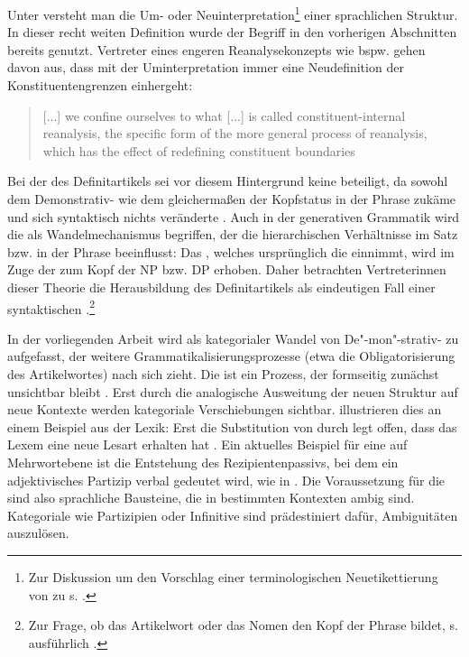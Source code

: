 Unter  versteht man die Um- oder Neuinterpretation\footnote{Zur Diskussion um den Vorschlag einer terminologischen Neuetikettierung von  zu  s.  \textcite[36]{Traugott2013}.} einer sprachlichen Struktur. In dieser recht weiten Definition wurde der Begriff in den vorherigen Abschnitten bereits genutzt. Vertreter eines engeren Reanalysekonzepts  wie bspw. \textcite[215]{Heine1991} gehen davon aus, dass mit der Uminterpretation immer eine Neudefinition der Konstituentengrenzen einhergeht: \blockcquote[216]{Heine1991}{[...] we confine ourselves to what [...] is called constituent-internal reanalysis, the specific form of the more general process of reanalysis, which has the effect of redefining constituent boundaries}. Bei der  des Definitartikels sei vor diesem Hintergrund keine   beteiligt, da sowohl dem Demonstrativ-  wie dem  gleichermaßen der Kopfstatus in der Phrase zukäme und sich syntaktisch nichts veränderte \parencite[219]{Heine1991}. Auch in der generativen Grammatik wird die  als Wandelmechanismus begriffen, der die hierarchischen Verhältnisse im Satz bzw. in der Phrase beeinflusst: Das , welches ursprünglich die  einnimmt, wird im Zuge der  zum Kopf der NP  bzw. DP erhoben. Daher betrachten Vertreterinnen dieser Theorie die Herausbildung des Definitartikels als eindeutigen Fall einer syntaktischen  \parencite[vgl. bspw.][]{Philippi1997,vanGelderen2007}.\footnote{Zur Frage, ob das Artikelwort oder das Nomen den Kopf der Phrase bildet, s. ausführlich \textcite[145--146]{Himmelmann1997}.}

In der vorliegenden Arbeit wird  als kategorialer Wandel von De"-mon"-strativ- zu  aufgefasst, der weitere Grammatikalisierungsprozesse  (etwa die Obligatorisierung des Artikelwortes) nach sich zieht. Die  ist ein Prozess, der formseitig zunächst unsichtbar bleibt \parencite[58]{Langacker1977}. Erst durch die analogische  Ausweitung der neuen Struktur auf neue Kontexte werden kategoriale Verschiebungen sichtbar. \textcite[50]{Hopper2006} illustrieren dies an einem Beispiel aus der Lexik: Erst die Substitution von  durch  legt offen, dass das Lexem  eine neue Lesart erhalten hat \parencite[urspr. ][389]{Kluge2011}. Ein aktuelles Beispiel für eine  auf Mehrwortebene ist die Entstehung des Rezipientenpassivs, bei dem ein adjektivisches Partizip  verbal gedeutet wird, wie in  \parencite[152--153]{Szczepaniak2011a}.
Die Voraussetzung für die  sind also sprachliche Bausteine, die in bestimmten Kontexten ambig sind. Kategoriale  wie Partizipien oder Infinitive \parencite[vgl. die  des -Progressivs: Aus einem nominalen wird ein verbaler Infinitiv, s.][]{Flick2013} sind prädestiniert dafür, Ambiguitäten auszulösen. 


